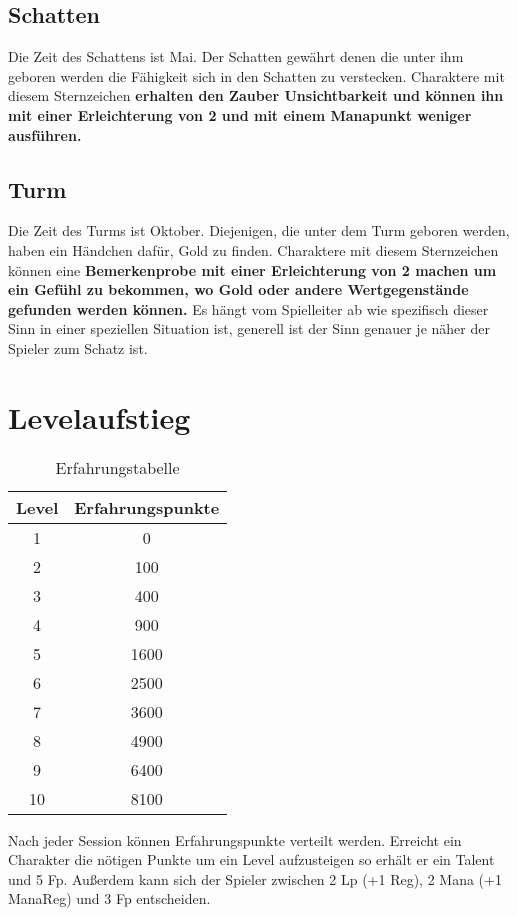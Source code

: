 \documentclass[../../Heldenanleitung2]{subfiles}
\begin{document}
\subsection{Schatten}
Die Zeit des Schattens ist Mai. Der Schatten gewährt denen die unter ihm geboren werden die Fähigkeit sich in den Schatten zu verstecken. Charaktere mit diesem Sternzeichen \textbf{erhalten den Zauber Unsichtbarkeit und können ihn mit einer Erleichterung von 2 und mit  einem Manapunkt weniger ausführen.}

\subsection{Turm}
Die Zeit des Turms ist Oktober. Diejenigen, die unter dem Turm geboren werden, haben ein Händchen dafür, Gold zu finden. Charaktere mit diesem Sternzeichen können eine \textbf{Bemerkenprobe mit einer Erleichterung von 2 machen um ein Gefühl zu bekommen, wo Gold oder andere Wertgegenstände gefunden werden können.} Es hängt vom Spielleiter ab wie spezifisch dieser Sinn in einer speziellen Situation ist, generell ist der Sinn genauer je näher der Spieler zum Schatz ist.

\section{Levelaufstieg}

\begin{wraptable}{r}{6cm}
\centering
\begin{tabular}{|c|c|}
\hline
Level & Erfahrungspunkte \\ \hline
1 & 0\\ \hline
2 & 100\\ \hline
3 & 400\\ \hline
4 & 900\\ \hline
5 & 1600\\ \hline
6 & 2500\\ \hline
7 & 3600\\ \hline
8 & 4900\\ \hline
9 & 6400\\ \hline
10 & 8100\\ \hline
\end{tabular}
\caption{Erfahrungstabelle}
\end{wraptable}
Nach jeder Session können Erfahrungspunkte verteilt werden. Erreicht ein Charakter die nötigen Punkte um ein Level aufzusteigen so erhält er ein Talent und 5 Fp. Außerdem kann sich der Spieler zwischen 2 Lp (+1 Reg), 2 Mana (+1 ManaReg) und 3 Fp entscheiden.
\end{document}
